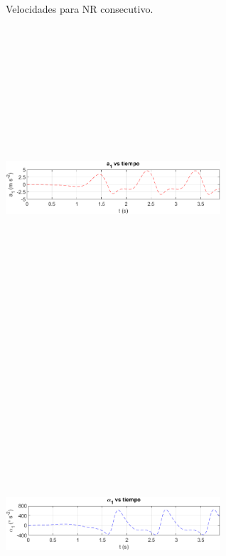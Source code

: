 \documentclass[12pt]{article}
\begin{document}
\begin{multicols}{2}
\begin{figure} [H]
        \caption{Velocidades para NR consecutivo.}
        \label{}
    \end{figure}
\begin{figure} [H]
        \centerline{\includegraphics[width=8cm, height=12cm,keepaspectratio]{NR Consecutivo/a1.png}}
    \end{figure}
        \vspace{-20pt}
        \begin{figure} [H]
        \centerline{\includegraphics[width=8cm, height=12cm,keepaspectratio]{NR Consecutivo/alpha1.png}}

\end{figure}
\end{multicols}
\end{document}
